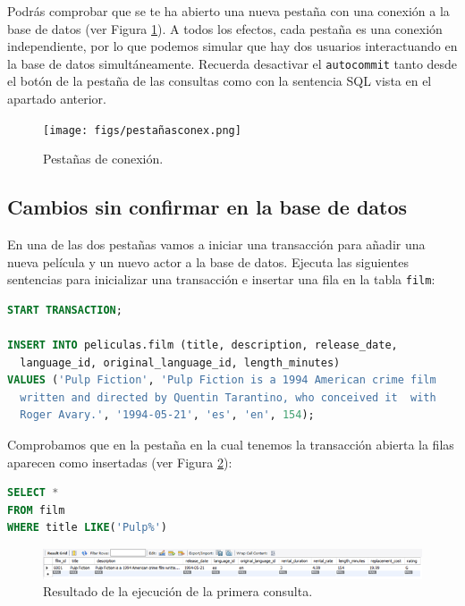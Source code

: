 \documentclass{db-practice}
\begin{document}
Podrás comprobar que se te ha abierto una nueva pestaña con una conexión a la base de datos (ver Figura \ref{fig:pestañas}). A todos los efectos, cada pestaña es una conexión independiente, por lo que podemos simular que hay dos usuarios interactuando en la base de datos simultáneamente. Recuerda desactivar el \texttt{autocommit} tanto desde el botón de la pestaña de las consultas como con la sentencia SQL vista en el apartado anterior.

\begin{figure}[ht]
    \centering
    \texttt{[image: figs/pestañasconex.png]}
    \caption{Pestañas de conexión.}\label{fig:pestañas}
\end{figure}

\subsection*{Cambios sin confirmar en la base de datos}

En una de las dos pestañas vamos a iniciar una transacción para añadir una nueva película y un nuevo actor a la base de datos. Ejecuta las siguientes sentencias para inicializar una transacción e insertar una fila en la tabla \texttt{film}:

\begin{lstlisting}[language=SQL]
START TRANSACTION;

INSERT INTO peliculas.film (title, description, release_date, 
  language_id, original_language_id, length_minutes) 
VALUES ('Pulp Fiction', 'Pulp Fiction is a 1994 American crime film 
  written and directed by Quentin Tarantino, who conceived it  with 
  Roger Avary.', '1994-05-21', 'es', 'en', 154);
\end{lstlisting}

Comprobamos que en la pestaña en la cual tenemos la transacción abierta la filas aparecen como insertadas (ver Figura \ref{fig:1consulta}):

\begin{lstlisting}[language=SQL]
SELECT * 
FROM film
WHERE title LIKE('Pulp%')
\end{lstlisting}

\begin{figure}[ht]
    \centering
    \includegraphics[width=0.9\columnwidth]{figs/1consulta.png}
    \caption{Resultado de la ejecución de la primera consulta.}\label{fig:1consulta}
\end{figure}
\end{document}

